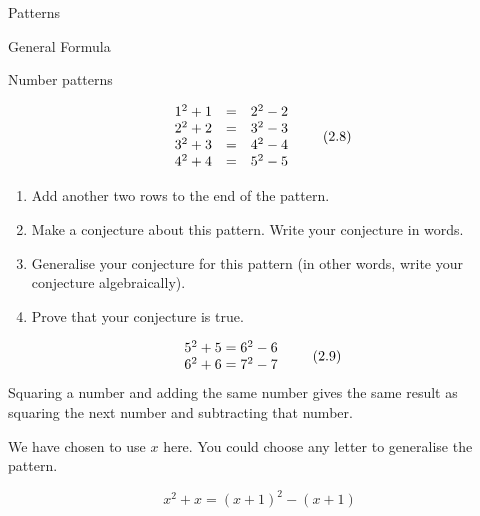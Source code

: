 \begin{exercises}{Patterns }
\begin{exercises}{General Formula }
\begin{wex}{ Number patterns }
{          
    \begin{equation}
    \begin{array}{ccc}\hfill {1}^{2}+1& =& {2}^{2}-2\hfill \\ \hfill {2}^{2}+2& =& {3}^{2}-3\hfill \\ \hfill {3}^{2}+3& =& {4}^{2}-4\hfill \\ \hfill {4}^{2}+4& =& {5}^{2}-5\hfill \end{array}\tag{2.8}
      \end{equation}
        \label{m39362*id66291}\begin{enumerate}[noitemsep, label=\textbf{\arabic*}. ] 
            \leftskip=20pt\rightskip=\leftskip\label{m39362*uid26}\item Add another two rows to the end of the pattern.
\label{m39362*uid27}\item Make a conjecture about this pattern. Write your conjecture in words.
\label{m39362*uid28}\item Generalise your conjecture for this pattern (in other words, write your conjecture algebraically).
\label{m39362*uid29}\item Prove that your conjecture is true.
\end{enumerate}}{
%           
\westep{}  
  \begin{equation}
    \begin{array}{cc}\hfill {5}^{2}+5={6}^{2}-6\\ \hfill {6}^{2}+6={7}^{2}-7\end{array}\tag{2.9}
      \end{equation}
        \westep{}  
        \label{m39362*id66445}Squaring a number and adding the same number gives the same result as squaring the next number and subtracting that number.\par 
        \westep{}
        \label{m39362*id66453}We have chosen to use $x$ here. You could choose any letter to generalise the pattern.\par 
        \label{m39362*id66467}\nopagebreak\noindent{}
          
    \begin{equation}
    {x}^{2}+x={\left(x+1\right)}^{2}-\left(x+1\right)\tag{2.10}
      \end{equation}
        \westep{}  
          
}
\end{wex}
\end{exercises}
\end{exercises}

